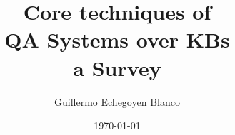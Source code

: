 \documentclass{beamer}
\date{\today}
\title{Core techniques of \\ \textbf{QA Systems over KBs \\ a Survey \\ }}
\author{Guillermo Echegoyen Blanco}
\begin{document}
\maketitle


\begin{frame}
\end{frame}

\end{document}
